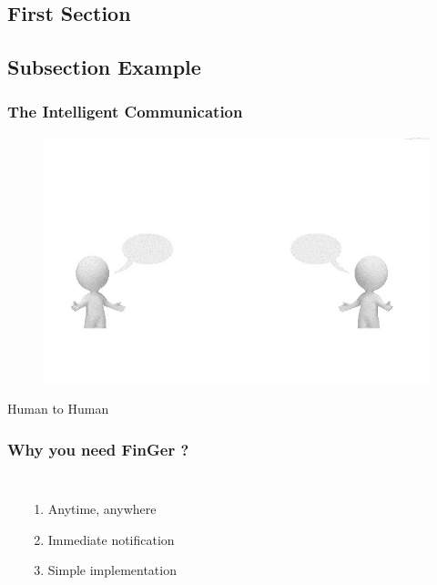 \documentclass{beamer}
\begin{document}
\begin{CJK}{UTF8}{bsmi}
\section{First Section} %

\subsection{Subsection Example} %

\begin{frame}
\frametitle{The Intelligent Communication}
\begin{figure}
\includegraphics[width=0.8\linewidth]{human.jpg}
\end{figure}
\begin{center}
Human to Human
\end{center}

\end{frame}


\begin{frame}
\frametitle{Why you need FinGer ?}

\begin{columns}[c]
\textbf{}
\begin{enumerate}
\item Anytime, anywhere
\item Immediate notification
\item Simple implementation
\end{enumerate}


\end{columns}
\end{frame}
\end{CJK}
\end{document}
